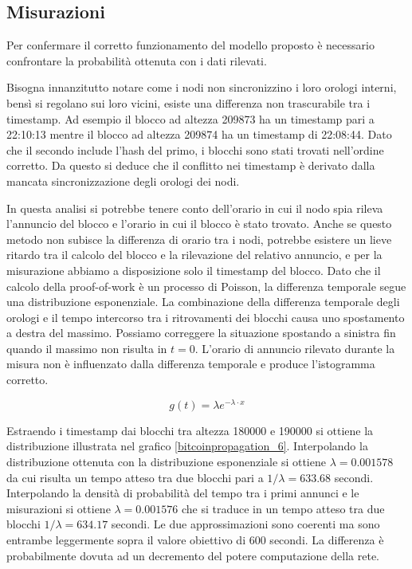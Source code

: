 \subsection{Misurazioni}\label{misurazioni}

Per confermare il corretto funzionamento del modello proposto è necessario confrontare la probabilità ottenuta con i dati rilevati.

Bisogna innanzitutto notare come i nodi non sincronizzino i loro orologi interni, bensì si regolano sui loro vicini, esiste una differenza non trascurabile tra i timestamp. Ad esempio il blocco ad altezza 209873 ha un timestamp pari a 22:10:13 mentre il blocco ad altezza 209874 ha un timestamp di 22:08:44. Dato che il secondo include l'hash del primo, i blocchi sono stati trovati nell'ordine corretto. Da questo si deduce che il conflitto nei timestamp è derivato dalla mancata sincronizzazione degli orologi dei nodi.

In questa analisi si potrebbe tenere conto dell'orario in cui il nodo spia rileva l'annuncio del blocco e l'orario in cui il blocco è stato trovato. Anche se questo metodo non subisce la differenza di orario tra i nodi, potrebbe esistere un lieve ritardo tra il calcolo del blocco e la rilevazione del relativo annuncio, e per la misurazione abbiamo a disposizione solo il timestamp del blocco. Dato che il calcolo della proof-of-work è un processo di Poisson, la differenza temporale segue una distribuzione esponenziale. La combinazione della differenza temporale degli orologi e il tempo intercorso tra i ritrovamenti dei blocchi causa uno spostamento a destra del massimo. Possiamo correggere la situazione spostando a sinistra fin quando il massimo non risulta in $t=0$. L'orario di annuncio rilevato durante la misura non è influenzato dalla differenza temporale e produce l'istogramma corretto.


\[ g(t) = \lambda e^{-\lambda \cdot x}\]

Estraendo i timestamp dai blocchi tra altezza 180000 e 190000 si ottiene la distribuzione illustrata nel grafico \ref{bitcoinpropagation_6}. Interpolando la distribuzione ottenuta con la distribuzione esponenziale si ottiene $\lambda = 0.001578$ da cui risulta un tempo atteso tra due blocchi pari a $1 / \lambda = 633.68$ secondi. Interpolando la densità di probabilità del tempo tra i primi annunci e le misurazioni si ottiene $\lambda = 0.001576$ che si traduce in un tempo atteso tra due blocchi $1/ \lambda = 634.17$ secondi. Le due approssimazioni sono coerenti ma sono entrambe leggermente sopra il valore obiettivo di 600 secondi. La differenza è probabilmente dovuta ad un decremento del potere computazione della rete.

